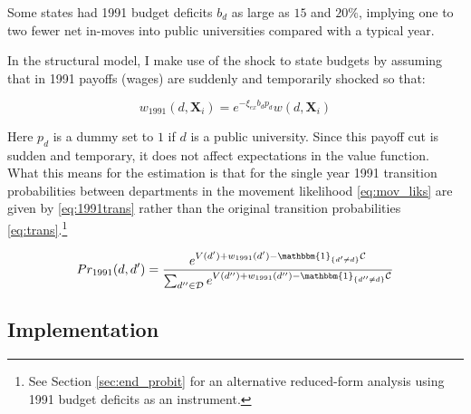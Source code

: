 \documentclass[]{article}
\begin{document}
Some states had 1991 budget deficits $b_d$ as large as $15$ and $20\%$, implying
one to two fewer net in-moves into public universities compared with a typical year.

In the structural model, I make use of the shock to state budgets by assuming that in 1991 payoffs
 (wages) are suddenly and temporarily shocked so that:

\begin{equation}
    w_{1991}(d, \mathbf{X}_i) = e^{- \xi_{ex} b_d p_d} w(d, \mathbf{X}_i)
    \label{eq:exog_var}
\end{equation}

Here $p_d$ is a dummy set to $1$ if $d$ is a public university.  Since this payoff
cut is sudden and temporary, it does not affect
expectations in the value function.  What this means for the estimation is that
for the single year 1991 transition probabilities between departments 
in the movement likelihood \eqref{eq:mov_liks} are given by \eqref{eq:1991trans} rather than
the original transition probabilities \eqref{eq:trans}.\footnote{See Section \ref{sec:end_probit} for an alternative
reduced-form analysis using 1991 budget deficits as an instrument.}

\begin{equation}
    Pr_{1991}(d,d') = \frac{e^{V(d') + w_{1991}(d') - \mathbbm{1}_{\{d'\neq d\}}\mathcal{C}}}{\sum_{d'' \in \mathcal{D}} e^{V(d'') + w_{1991}(d'') - \mathbbm{1}_{\{d''\neq d\}} \mathcal{C}}}
    \label{eq:1991trans}
\end{equation}

\subsection{Implementation}
\end{document}
